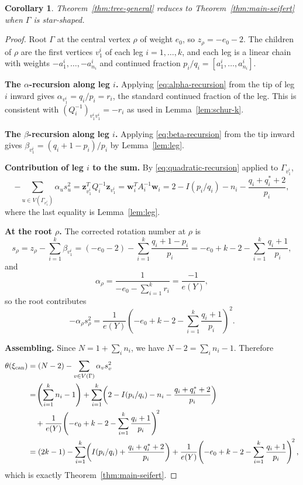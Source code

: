 \documentclass[11pt]{amsart}
\theoremstyle{plain}
\newtheorem{corollary}[theorem]{Corollary}
\theoremstyle{definition}
\theoremstyle{remark}
\begin{document}
\begin{corollary}\label{cor:star-recovery}
Theorem~\ref{thm:tree-general} reduces to Theorem~\ref{thm:main-seifert}
when $\Gamma$ is star-shaped.
\end{corollary}

\begin{proof}
Root $\Gamma$ at the central vertex $\rho$ of weight $e_0$, so
$z_\rho=-e_0-2$. The children of $\rho$ are the first vertices
$v_1^i$ of each leg $i=1,\dots,k$, and each leg is a linear chain
with weights $-a_1^i,\dots,-a_{n_i}^i$ and continued fraction
$p_i/q_i=[a_1^i,\dots,a_{n_i}^i]$.

\medskip
\noindent\textbf{The $\alpha$-recursion along leg $i$.}
Applying \eqref{eq:alpha-recursion} from the tip of leg $i$ inward
gives $\alpha_{v_1^i}=q_i/p_i=r_i$, the standard continued fraction of
the leg. This is consistent with $(Q_i^{-1})_{v_1^iv_1^i}=-r_i$ as
used in Lemma~\ref{lem:schur-k}.

\medskip
\noindent\textbf{The $\beta$-recursion along leg $i$.}
Applying \eqref{eq:beta-recursion} from the tip inward gives
$\beta_{v_1^i}=(q_i+1-p_i)/p_i$ by Lemma~\ref{lem:leg}.

\medskip
\noindent\textbf{Contribution of leg $i$ to the sum.}
By \eqref{eq:quadratic-recursion} applied to $\Gamma_{v_1^i}$,
\[
-\sum_{u\in V(\Gamma_{v_1^i})}\alpha_u s_u^2
=\mathbf{z}_{v_1^i}^TQ_i^{-1}\mathbf{z}_{v_1^i}
=\mathbf{w}_i^TA_i^{-1}\mathbf{w}_i
=2-I(p_i/q_i)-n_i-\frac{q_i+q_i^*+2}{p_i},
\]
where the last equality is Lemma~\ref{lem:leg}.

\medskip
\noindent\textbf{At the root $\rho$.}
The corrected rotation number at $\rho$ is
\[
s_\rho
=z_\rho-\sum_{i=1}^k\beta_{v_1^i}
=(-e_0-2)-\sum_{i=1}^k\frac{q_i+1-p_i}{p_i}
=-e_0+k-2-\sum_{i=1}^k\frac{q_i+1}{p_i},
\]
and
\[
\alpha_\rho
=\frac{1}{-e_0-\sum_{i=1}^k r_i}
=\frac{-1}{e(Y)},
\]
so the root contributes
\[
-\alpha_\rho s_\rho^2
=\frac{1}{e(Y)}
\!\left(-e_0+k-2-\sum_{i=1}^k\frac{q_i+1}{p_i}\right)^{\!2}.
\]

\medskip
\noindent\textbf{Assembling.}
Since $N=1+\sum_i n_i$, we have $N-2=\sum_i n_i-1$. Therefore
\begin{align*}
\theta(\xi_{\rm can})
&=(N-2)-\sum_{v\in V(\Gamma)}\alpha_v s_v^2\\
&=\!\left(\sum_{i=1}^k n_i-1\right)
+\sum_{i=1}^k\!\left(2-I(p_i/q_i)-n_i-\frac{q_i+q_i^*+2}{p_i}\right)\\
&\quad
+\frac{1}{e(Y)}\!\left(-e_0+k-2-\sum_{i=1}^k\frac{q_i+1}{p_i}\right)^{\!2}\\
&=(2k-1)
-\sum_{i=1}^k\!\left(I(p_i/q_i)+\frac{q_i+q_i^*+2}{p_i}\right)
+\frac{1}{e(Y)}\!\left(-e_0+k-2-\sum_{i=1}^k\frac{q_i+1}{p_i}\right)^{\!2},
\end{align*}
which is exactly Theorem~\ref{thm:main-seifert}.
\end{proof}
\end{document}
